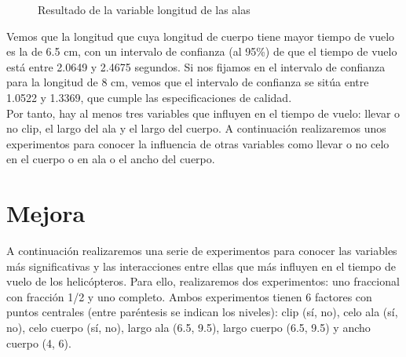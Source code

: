 \documentclass[12pt,a4paper,twoside,openright,titlepage,final]{article}
\begin{document}
\begin{figure}[htbp!]
	\centering
	\caption{Resultado de la variable longitud de las alas} \label{fig:resultado_largo_cuerpo}
\end{figure}

Vemos que la longitud que cuya longitud de cuerpo tiene mayor tiempo de vuelo es la de 6.5 cm, con un intervalo de confianza (al 95\%) de que el tiempo de vuelo está entre 2.0649 y 2.4675 segundos. Si nos fijamos en el intervalo de confianza para la longitud de 8 cm, vemos que el intervalo de confianza se sitúa entre 1.0522 y 1.3369, que cumple las especificaciones de calidad.\\

Por tanto, hay al menos tres variables que influyen en el tiempo de vuelo: llevar o no clip, el largo del ala y el largo del cuerpo. A continuación realizaremos unos experimentos para conocer la influencia de otras variables como llevar o no celo en el cuerpo o en ala o  el ancho del cuerpo.

\section{Mejora}

A continuación realizaremos una serie de experimentos para conocer las variables más significativas y las interacciones entre ellas que más influyen en el tiempo de vuelo de los helicópteros. Para ello, realizaremos dos experimentos: uno fraccional con fracción 1/2 y uno completo. Ambos experimentos tienen 6 factores con puntos centrales (entre paréntesis se indican los niveles): clip (sí, no), celo ala (sí, no), celo cuerpo (sí, no), largo ala (6.5, 9.5), largo cuerpo (6.5, 9.5)  y ancho cuerpo (4, 6).\\
\end{document}
